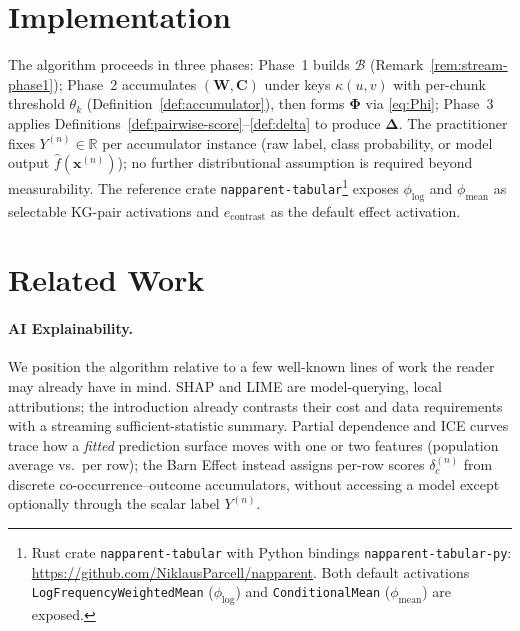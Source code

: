 \documentclass[11pt]{article}
\begin{document}
\section{Implementation}
\label{sec:implementation}

The algorithm proceeds in three phases: Phase~1 builds $\mathcal{B}$ (Remark~\ref{rem:stream-phase1}); Phase~2 accumulates $(\bm{W},\bm{C})$ under keys $\kappa(u,v)$ with per-chunk threshold $\theta_k$ (Definition~\ref{def:accumulator}), then forms $\bm{\Phi}$ via \eqref{eq:Phi}; Phase~3 applies Definitions~\ref{def:pairwise-score}--\ref{def:delta} to produce $\bm{\Delta}$.
The practitioner fixes $Y^{(n)} \in \mathbb{R}$ per accumulator instance (raw label, class probability, or model output $\hat{f}(\bm{x}^{(n)})$); no further distributional assumption is required beyond measurability.
The reference crate \texttt{napparent-tabular}\footnote{Rust crate \texttt{napparent-tabular} with Python bindings \texttt{napparent-tabular-py}: \url{https://github.com/NiklausParcell/napparent}. Both default activations \texttt{LogFrequencyWeightedMean} ($\phi_{\log}$) and \texttt{ConditionalMean} ($\phi_{\mathrm{mean}}$) are exposed.} exposes $\phi_{\log}$ and $\phi_{\mathrm{mean}}$ as selectable KG-pair activations and $e_{\mathrm{contrast}}$ as the default effect activation.

\section{Related Work}
\label{sec:related}

\paragraph{AI Explainability.}
We position the algorithm relative to a few well-known lines of work the reader may already have in mind.
SHAP \cite{Lundberg2017} and LIME \cite{Ribeiro2016} are model-querying, local attributions; the introduction already contrasts their cost and data requirements with a streaming sufficient-statistic summary.
Partial dependence \cite{Friedman2001} and ICE curves \cite{Goldstein2015} trace how a \emph{fitted} prediction surface moves with one or two features (population average vs.\ per row); the Barn Effect instead assigns per-row scores $\delta_c^{(n)}$ from discrete co-occurrence--outcome accumulators, without accessing a model except optionally through the scalar label $Y^{(n)}$.
\end{document}
